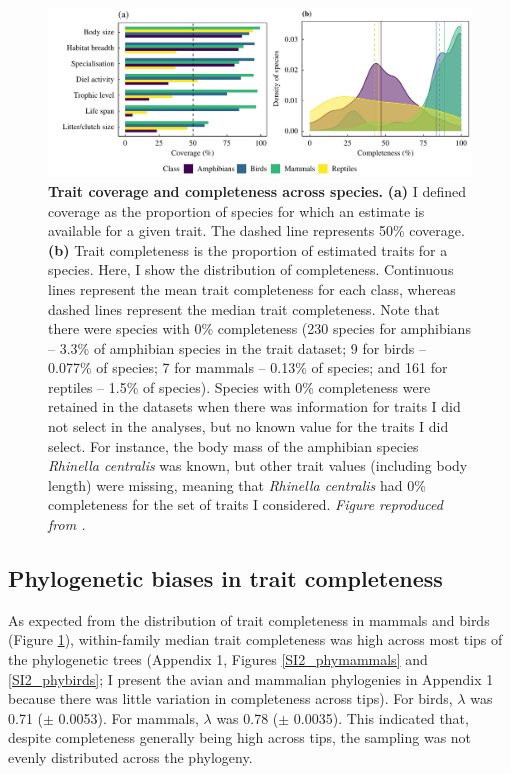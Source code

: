 \begin{figure}[h!]
\centering
\includegraphics[scale=0.7]{figures/Chapter2/Figure1_revised}
\caption[Trait coverage and completeness across species]{\textbf{Trait coverage and completeness across species.} \textbf{(a)} I defined coverage as the proportion of species for which an estimate is available for a given trait. The dashed line represents 50\% coverage. \textbf{(b)} Trait completeness is the proportion of estimated traits for a species. Here, I show the distribution of completeness. Continuous lines represent the mean trait completeness for each class, whereas dashed lines represent the median trait completeness. Note that there were species with 0\% completeness (230 species for amphibians -- 3.3\% of amphibian species in the trait dataset; 9 for birds -- 0.077\% of species; 7 for mammals -- 0.13\% of species; and 161 for reptiles -- 1.5\% of species). Species with 0\% completeness were retained in the datasets when there was information for traits I did not select in the analyses, but no known value for the traits I did select. For instance, the body mass of the amphibian species \textit{Rhinella centralis} was known, but other trait values (including body length) were missing, meaning that \textit{Rhinella centralis} had 0\% completeness for the set of traits I considered. \textit{Figure reproduced from \citet{Etard2020}.}}
\label{1_Coverage}
\end{figure}


\subsection{Phylogenetic biases in trait completeness}
As expected from the distribution of trait completeness in mammals and birds (Figure \ref{1_Coverage}), within-family median trait completeness was high across most tips of the phylogenetic trees (Appendix 1, Figures \ref{SI2_phymammals} and \ref{SI2_phybirds}; I present the avian and mammalian phylogenies in Appendix 1 because there was little variation in completeness across tips). For birds, $\lambda$ was 0.71 ($\pm$ 0.0053). For mammals, $\lambda$ was 0.78 ($\pm$ 0.0035). This indicated that, despite completeness generally being high across tips, the sampling was not evenly distributed across the phylogeny.

